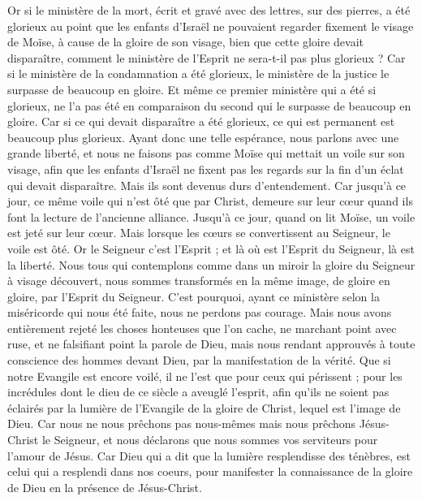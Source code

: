 \begin{multicols}{2}
Or si le ministère de la mort, écrit et gravé avec des lettres, sur des pierres, a été glorieux au point que les enfants d'Israël ne pouvaient regarder fixement le visage de Moïse, à cause de la gloire de son visage, bien que cette gloire devait disparaître,
comment le ministère de l'Esprit ne sera-t-il pas plus glorieux ?
Car si le ministère de la condamnation a été glorieux, le ministère de la justice le surpasse de beaucoup en gloire.
Et même ce premier ministère qui a été si glorieux, ne l'a pas été en comparaison du second qui le surpasse de beaucoup en gloire.
Car si ce qui devait disparaître a été glorieux, ce qui est permanent est beaucoup plus glorieux.
Ayant donc une telle espérance, nous parlons avec une grande liberté,
et nous ne faisons pas comme Moïse qui mettait un voile sur son visage, afin que les enfants d'Israël ne fixent pas les regards sur la fin d’un éclat qui devait disparaître.
Mais ils sont devenus durs d’entendement. Car jusqu'à ce jour, ce même voile qui n’est ôté que par Christ, demeure sur leur cœur quand ils font la lecture de l'ancienne alliance.
Jusqu'à ce jour, quand on lit Moïse, un voile est jeté sur leur cœur.
Mais lorsque les cœurs se convertissent au Seigneur, le voile est ôté.
Or le Seigneur c’est l’Esprit ; et là où est l'Esprit du Seigneur, là est la liberté.
Nous tous qui contemplons comme dans un miroir la gloire du Seigneur à visage découvert, nous sommes transformés en la même image, de gloire en gloire, par l'Esprit du Seigneur.
\VerseOne{}C'est pourquoi, ayant ce ministère selon la miséricorde qui nous été faite, nous ne perdons pas courage.
Mais nous avons entièrement rejeté les choses honteuses que l'on cache, ne marchant point avec ruse, et ne falsifiant point la parole de Dieu, mais nous rendant approuvés à toute conscience des hommes devant Dieu, par la manifestation de la vérité.
Que si notre Evangile est encore voilé, il ne l'est que pour ceux qui périssent ;
pour les incrédules dont le dieu de ce siècle a aveuglé l’esprit, afin qu’ils ne soient pas éclairés par la lumière de l'Evangile de la gloire de Christ, lequel est l'image de Dieu.
Car nous ne nous prêchons pas nous-mêmes mais nous prêchons Jésus-Christ le Seigneur, et nous déclarons que nous sommes vos serviteurs pour l'amour de Jésus.
Car Dieu qui a dit que la lumière resplendisse des ténèbres, est celui qui a resplendi dans nos coeurs, pour manifester la connaissance de la gloire de Dieu en la présence de Jésus-Christ.

\end{multicols}
